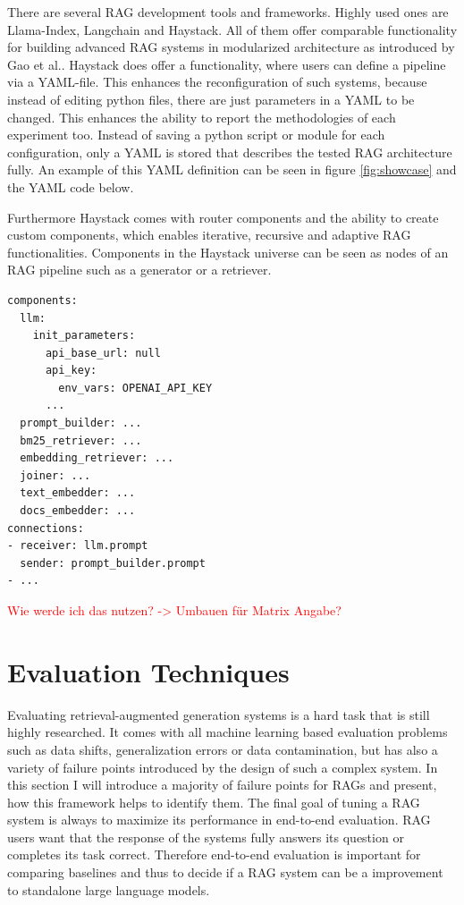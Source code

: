 There are several RAG development tools and frameworks. Highly used ones are Llama-Index\cite{Liu_LlamaIndex_2022}, Langchain\cite{Chase_LangChain_2022} and Haystack\cite{Pietsch_Haystack_the_end-to-end_2019}. All of them offer comparable functionality for building advanced RAG systems in modularized architecture as introduced by Gao et al.\cite{Gao.18.12.2023}. Haystack does offer a functionality, where users can define a pipeline via a YAML-file. This enhances the reconfiguration of such systems, because instead of editing python files, there are just parameters in a YAML to be changed. This enhances the ability to report the methodologies of each experiment too. Instead of saving a python script or module for each configuration, only a YAML is stored that describes the tested RAG architecture fully. An example of this YAML definition can be seen in figure \ref{fig:showcase} and the YAML code below.

Furthermore Haystack comes with router components and the ability to create custom components, which enables iterative, recursive and adaptive RAG functionalities. Components in the Haystack universe can be seen as nodes of an RAG pipeline such as a generator or a retriever. 

\newpage
\begin{verbatim}
components:
  llm:
    init_parameters:
      api_base_url: null
      api_key:
        env_vars: OPENAI_API_KEY
      ...
  prompt_builder: ...
  bm25_retriever: ...
  embedding_retriever: ...
  joiner: ...
  text_embedder: ...
  docs_embedder: ...
connections:
- receiver: llm.prompt
  sender: prompt_builder.prompt
- ...
\end{verbatim}

\textcolor{red}{Wie werde ich das nutzen? -> Umbauen für Matrix Angabe?}

\section{Evaluation Techniques}

Evaluating retrieval-augmented generation systems is a hard task that is still highly researched. It comes with all machine learning based evaluation problems such as data shifts, generalization errors or data contamination, but has also a variety of failure points introduced by the design of such a complex system. In this section I will introduce a majority of failure points for RAGs and present, how this framework helps to identify them. The final goal of tuning a RAG system is always to maximize its performance in end-to-end evaluation. RAG users want that the response of the systems fully answers its question or completes its task correct. Therefore end-to-end evaluation is important for comparing baselines and thus to decide if a RAG system can be a improvement to standalone large language models. 

